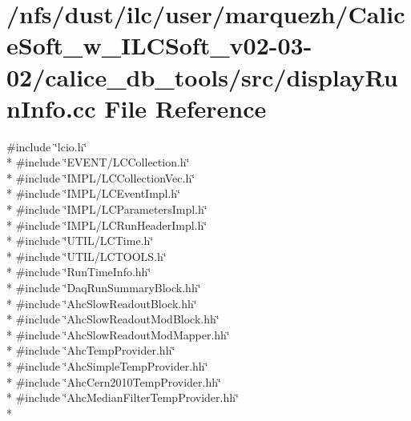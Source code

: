 \section{/nfs/dust/ilc/user/marquezh/\-Calice\-Soft\-\_\-w\-\_\-\-I\-L\-C\-Soft\-\_\-v02-\/03-\/02/calice\-\_\-db\-\_\-tools/src/display\-Run\-Info.cc File Reference}
\label{displayRunInfo_8cc}
{\ttfamily \#include \char`\"{}lcio.\-h\char`\"{}}\\*
{\ttfamily \#include \char`\"{}E\-V\-E\-N\-T/\-L\-C\-Collection.\-h\char`\"{}}\\*
{\ttfamily \#include \char`\"{}I\-M\-P\-L/\-L\-C\-Collection\-Vec.\-h\char`\"{}}\\*
{\ttfamily \#include \char`\"{}I\-M\-P\-L/\-L\-C\-Event\-Impl.\-h\char`\"{}}\\*
{\ttfamily \#include \char`\"{}I\-M\-P\-L/\-L\-C\-Parameters\-Impl.\-h\char`\"{}}\\*
{\ttfamily \#include \char`\"{}I\-M\-P\-L/\-L\-C\-Run\-Header\-Impl.\-h\char`\"{}}\\*
{\ttfamily \#include \char`\"{}U\-T\-I\-L/\-L\-C\-Time.\-h\char`\"{}}\\*
{\ttfamily \#include \char`\"{}U\-T\-I\-L/\-L\-C\-T\-O\-O\-L\-S.\-h\char`\"{}}\\*
{\ttfamily \#include \char`\"{}Run\-Time\-Info.\-hh\char`\"{}}\\*
{\ttfamily \#include \char`\"{}Daq\-Run\-Summary\-Block.\-hh\char`\"{}}\\*
{\ttfamily \#include \char`\"{}Ahc\-Slow\-Readout\-Block.\-hh\char`\"{}}\\*
{\ttfamily \#include \char`\"{}Ahc\-Slow\-Readout\-Mod\-Block.\-hh\char`\"{}}\\*
{\ttfamily \#include \char`\"{}Ahc\-Slow\-Readout\-Mod\-Mapper.\-hh\char`\"{}}\\*
{\ttfamily \#include \char`\"{}Ahc\-Temp\-Provider.\-hh\char`\"{}}\\*
{\ttfamily \#include \char`\"{}Ahc\-Simple\-Temp\-Provider.\-hh\char`\"{}}\\*
{\ttfamily \#include \char`\"{}Ahc\-Cern2010\-Temp\-Provider.\-hh\char`\"{}}\\*
{\ttfamily \#include \char`\"{}Ahc\-Median\-Filter\-Temp\-Provider.\-hh\char`\"{}}\\*
